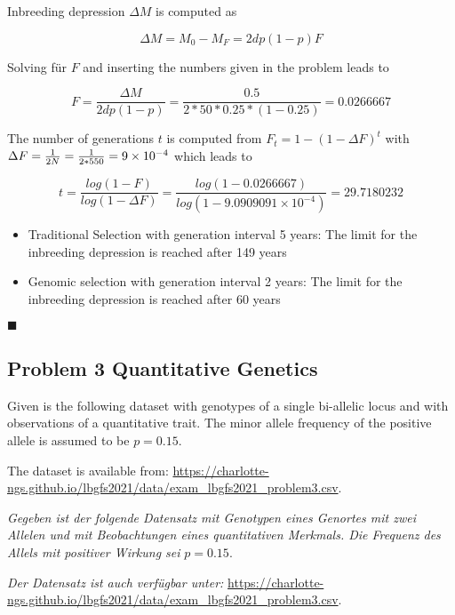 \documentclass[
]{article}
\newcommand{\solend}
{\vspace{2ex}$\blacksquare$}
\begin{document}
Inbreeding depression \(\Delta M\) is computed as

\[\Delta M = M_0 - M_F = 2dp(1-p)F\]

Solving für \(F\) and inserting the numbers given in the problem leads
to

\[F = \frac{\Delta M}{2dp(1-p)} = \frac{0.5}{2 * 50 * 0.25 * (1 - 0.25)} = 0.0266667\]

The number of generations \(t\) is computed from
\(F_t = 1-(1-\Delta F)^t\) with
\(\Delta F = {1 \over 2N} = {1 \over 2*550} = \ensuremath{9\times 10^{-4}}\)
which leads to

\[t = \frac{log(1-F)}{log(1- \Delta F)} = \frac{log(1 - 0.0266667)}{log(1 - \ensuremath{9.0909091\times 10^{-4}})} = 29.7180232\]

\begin{itemize}
\item
  Traditional Selection with generation interval 5 years: The limit for
  the inbreeding depression is reached after 149 years
\item
  Genomic selection with generation interval 2 years: The limit for the
  inbreeding depression is reached after 60 years
\end{itemize}

\solend

\hypertarget{problem-3-quantitative-genetics}{%
\subsection{Problem 3 Quantitative
Genetics}\label{problem-3-quantitative-genetics}}

Given is the following dataset with genotypes of a single bi-allelic
locus and with observations of a quantitative trait. The minor allele
frequency of the positive allele is assumed to be \(p = 0.15\).

The dataset is available from:
\url{https://charlotte-ngs.github.io/lbgfs2021/data/exam_lbgfs2021_problem3.csv}.

\textit{Gegeben ist der folgende Datensatz mit Genotypen eines Genortes mit zwei Allelen und mit Beobachtungen eines quantitativen Merkmals. Die Frequenz des Allels mit positiver Wirkung sei}
\(p = 0.15\).

\textit{Der Datensatz ist auch verfügbar unter: }
\url{https://charlotte-ngs.github.io/lbgfs2021/data/exam_lbgfs2021_problem3.csv}.

\vspace{3ex}
\end{document}
